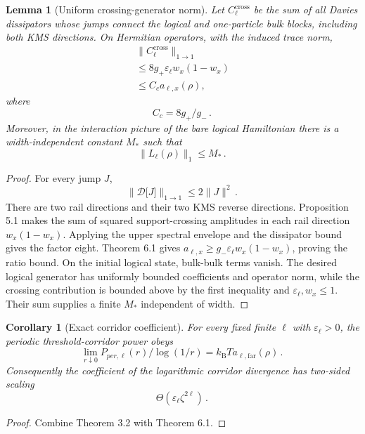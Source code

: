 \documentclass[11pt,a4paper]{article}
\newtheorem{lemma}[theorem]{Lemma}
\newtheorem{corollary}[theorem]{Corollary}
\theoremstyle{remark}
\begin{document}
\begin{lemma}[Uniform crossing-generator norm]
Let $C_\ell^{\mathrm{cross}}$ be the sum of all Davies dissipators whose jumps connect the logical and one-particle bulk blocks, including both KMS directions. On Hermitian operators, with the induced trace norm,
\[
\begin{gathered}
\lVert C_\ell^{\mathrm{cross}}\rVert_{1\to 1} \\
\le 8 g_+ \varepsilon_\ell w_x(1-w_x) \\
\le C_c a_{\ell,x}(\rho)\mathpunct{,}
\end{gathered}
\]
where
\[
C_c=8g_+/g_-\mathpunct{.}
\]
Moreover, in the interaction picture of the bare logical Hamiltonian there is a width-independent constant $M_*$ such that
\[
\lVert L_\ell(\rho)\rVert_1\le M_*\mathpunct{.}
\]
\end{lemma}
\begin{proof}
For every jump $J$,
\[
\lVert \mathcal{D}\bigl[J\bigr]\rVert_{1\to 1}\le 2\lVert J\rVert^{2}\mathpunct{.}
\]
There are two rail directions and their two KMS reverse directions. Proposition 5.1 makes the sum of squared support-crossing amplitudes in each rail direction $w_x(1-w_x)$. Applying the upper spectral envelope and the dissipator bound gives the factor eight. Theorem 6.1 gives $a_{\ell,x}\ge g_- \varepsilon_\ell w_x(1-w_x)$, proving the ratio bound.
On the initial logical state, bulk-bulk terms vanish. The desired logical generator has uniformly bounded coefficients and operator norm, while the crossing contribution is bounded above by the first inequality and $\varepsilon_\ell,w_x\le 1$. Their sum supplies a finite $M_*$ independent of width.
\end{proof}
\begin{corollary}[Exact corridor coefficient]
For every fixed finite $\ell$ with $\varepsilon_\ell>0$, the periodic threshold-corridor power obeys
\[
\lim_{r\downarrow 0} P_{per,\ell}(r)/\log(1/r)=k_{\mathrm B} T a_{\ell,\mathrm{far}}(\rho)\mathpunct{.}
\]
Consequently the coefficient of the logarithmic corridor divergence has two-sided scaling
\[
\Theta(\varepsilon_\ell \zeta^{2\ell})\mathpunct{.}
\]
\end{corollary}
\begin{proof}
Combine Theorem 3.2 with Theorem 6.1.
\end{proof}
\end{document}
